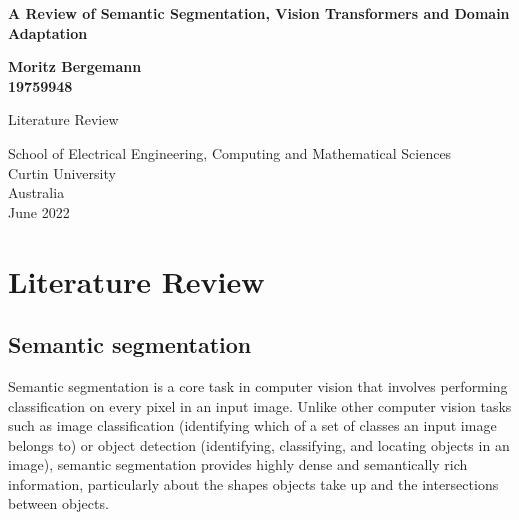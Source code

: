 \documentclass[a4paper,12pt]{report}
\begin{document}
{}
\begin{titlepage}
    \begin{center}
        \vspace*{0.5cm}
            
        \LARGE
        \textbf{A Review of Semantic Segmentation, Vision Transformers and Domain Adaptation}
            
            
        \vspace{1.0cm}
        \Large
            
        \textbf{Moritz Bergemann\\ 19759948}
            
        \vfill
            
        Literature Review
            
        \vspace{2.5cm}
            
            
        \large
        School of Electrical Engineering, Computing and Mathematical Sciences\\
        Curtin University\\
        Australia\\
        June 2022
            
    \end{center}
\end{titlepage}

\newpage
\tableofcontents
\newpage
\listoffigures
\newpage
\listoftables
\newpage
\thispagestyle{empty}

\chapter{Literature Review}
    \section{Semantic segmentation}
    Semantic segmentation is a core task in computer vision that involves performing classification on every pixel in an input image. Unlike other computer vision tasks such as image classification (identifying which of a set of classes an input image belongs to) or object detection (identifying, classifying, and locating objects in an image), semantic segmentation provides highly dense and semantically rich information, particularly about the shapes objects take up and the intersections between objects.
    
\end{document}
